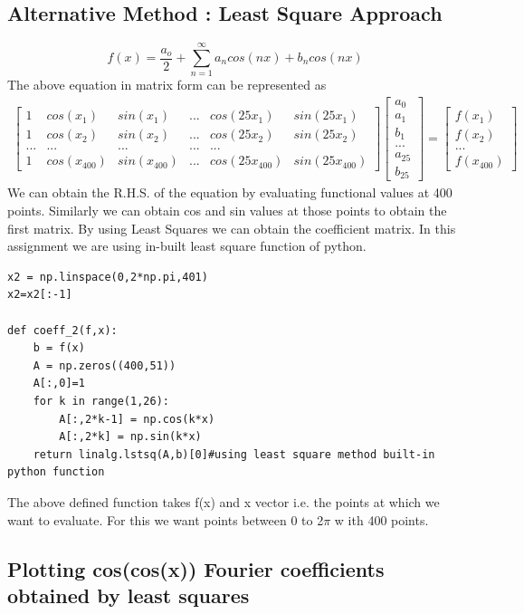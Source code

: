 \documentclass[a4paper]{article}
\begin{document}
\subsection{Alternative Method : Least Square Approach}
$$ f(x) = \frac{a_{o}}{2} + \sum_{n=1}^{\infty} a_{n}cos(nx) + b_{n}cos(nx) $$
The above equation in matrix form can be represented as
\begin{gather}
 \begin{bmatrix} 1 & cos(x_{1}) & sin(x_{1}) & ... & cos(25x_{1}) & sin(25x_{1}) \\  1 & cos(x_{2}) & sin(x_{2}) & ... & cos(25x_{2}) & sin(25x_{2}) \\ ... & ... & ...& ...& ... \\1 & cos(x_{400}) & sin(x_{400}) & ... & cos(25x_{400}) & sin(25x_{400}) \end{bmatrix}
 \begin{bmatrix}
 a_{0} \\ a_{1} \\ b_{1} \\ ... \\ a_{25} \\ b_{25}
 \end{bmatrix}
 =
  \begin{bmatrix}
 f(x_{1}) \\ f(x_{2}) \\ ... \\ f(x_{400})
   \end{bmatrix}
\end{gather}
We can obtain the R.H.S. of the equation by evaluating functional values at 400 points. Similarly we can obtain cos and sin values at those points to obtain the first matrix. By using Least Squares we can obtain the coefficient matrix. In this assignment we are using in-built least square function of python.
\begin{lstlisting}
x2 = np.linspace(0,2*np.pi,401)
x2=x2[:-1]

def coeff_2(f,x):
	b = f(x)
	A = np.zeros((400,51))
	A[:,0]=1
	for k in range(1,26):
		A[:,2*k-1] = np.cos(k*x)
		A[:,2*k] = np.sin(k*x)
	return linalg.lstsq(A,b)[0]#using least square method built-in python function
\end{lstlisting}

The above defined function takes f(x) and x vector i.e. the points at which we want to evaluate. For this we want points between 0 to 2$\pi$ w ith 400 points.

\subsection{Plotting cos(cos(x)) Fourier coefficients obtained by least squares}
\end{document}
